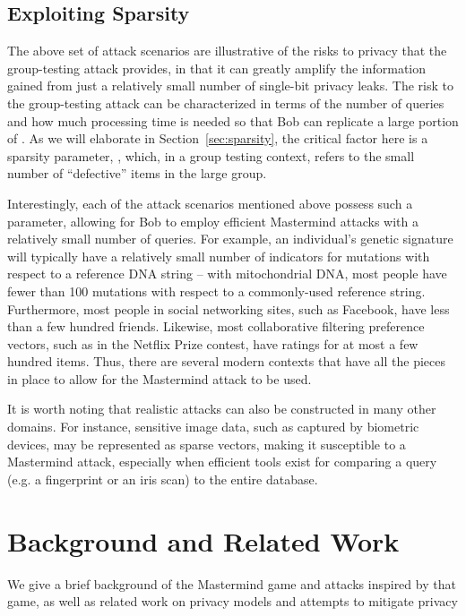 \documentclass{article}
\begin{document}
\subsection{Exploiting Sparsity}
The above set of attack
scenarios are illustrative of the risks to privacy that the
group-testing attack provides, in that it can greatly amplify 
the information gained from just a relatively small number
of single-bit privacy leaks.
The risk to the group-testing attack can
be characterized in terms of the number of 
queries and how much processing time is needed so that 
Bob can replicate a large portion of .
As we will elaborate in Section~\ref{sec:sparsity}, the critical 
factor here is a sparsity parameter, , which, in a group testing
context, refers to the small number of ``defective'' items in the large
group.

Interestingly, each of the attack scenarios mentioned above
possess such a parameter,
allowing for Bob to employ efficient Mastermind attacks with a
relatively small number of queries.
For example, an individual's genetic signature will
typically have a relatively small number of indicators for mutations
with respect to a reference DNA string -- 
with mitochondrial DNA, most people have fewer than 100
mutations with respect to a commonly-used reference string.
Furthermore, most people in social networking sites, such as
Facebook, have less than a few hundred friends.
Likewise, most collaborative filtering preference vectors, such 
as in the Netflix Prize contest, have
ratings for at most a few hundred items.
Thus, there are several modern contexts 
that have all the pieces in place to allow for the Mastermind
attack to be used.

It is worth noting that realistic attacks can also be constructed in many other domains.  
For instance, sensitive image data, such as captured by biometric devices, may be 
represented as sparse vectors, making it susceptible to a 
Mastermind attack, especially when efficient tools exist for
comparing a query (e.g. a fingerprint or an iris scan) to the entire
database.


\section{Background and Related Work}

We give a brief background of the Mastermind game and attacks inspired by that game,
as well as related work on privacy models and attempts to mitigate privacy leaks.
\end{document}
